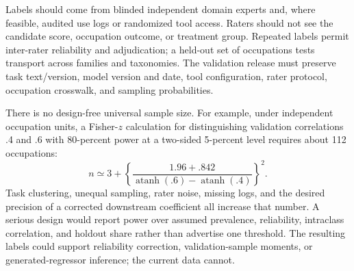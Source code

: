 Labels should come from blinded independent domain experts and, where feasible, audited use logs or randomized tool access. Raters should not see the candidate score, occupation outcome, or treatment group. Repeated labels permit inter-rater reliability and adjudication; a held-out set of occupations tests transport across families and taxonomies. The validation release must preserve task text/version, model version and date, tool configuration, rater protocol, occupation crosswalk, and sampling probabilities.

There is no design-free universal sample size. For example, under independent occupation units, a Fisher-$z$ calculation for distinguishing validation correlations .4 and .6 with 80-percent power at a two-sided 5-percent level requires about 112 occupations:
\[
n\simeq 3+\left\{\frac{1.96+.842}{\operatorname{atanh}(.6)-\operatorname{atanh}(.4)}\right\}^{2}.
\]
Task clustering, unequal sampling, rater noise, missing logs, and the desired precision of a corrected downstream coefficient all increase that number. A serious design would report power over assumed prevalence, reliability, intraclass correlation, and holdout share rather than advertise one threshold. The resulting labels could support reliability correction, validation-sample moments, or generated-regressor inference; the current data cannot.
\FloatBarrier
